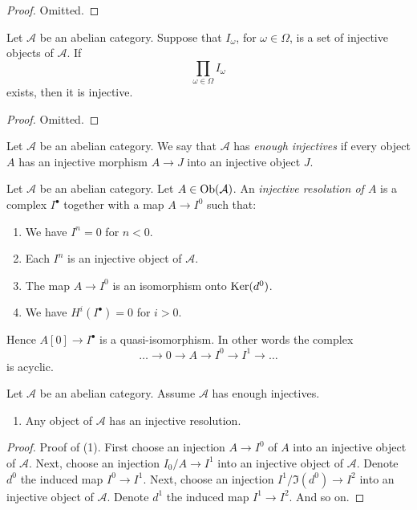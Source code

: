 \begin{proof}
Omitted.
\end{proof}

\begin{lemma}
\label{lemma-product-injectives}
Let $\mathcal{A}$ be an abelian category.
Suppose that $I_\omega$, for
$\omega \in \Omega$, is a set of injective
objects of $\mathcal{A}$. If
$$
\prod_{\omega \in \Omega} I_\omega
$$
exists, then it is injective.
\end{lemma}

\begin{proof}
Omitted.
\end{proof}

\begin{definition}
\label{definition-enough-injectives}
Let $\mathcal{A}$ be an abelian category.
We say that $\mathcal{A}$ has {\it enough
injectives} if every object $A$ has an
injective morphism $A \to J$ into an
injective object $J$.
\end{definition}

\begin{definition}
\label{definition-injective-resolution}
Let $\mathcal{A}$ be an abelian category.
Let $A \in \mathop{\mathrm{Ob}}\nolimits(\mathcal{A})$.
An {\it injective resolution of $A$} is a
complex $I^\bullet$ together with a map
$A \to I^0$ such that:
\begin{enumerate}
\item We have $I^n = 0$ for $n < 0$.
\item Each $I^n$ is an injective object of
$\mathcal{A}$.
\item The map $A \to I^0$ is an isomorphism
onto $\mathop{\mathrm{Ker}}(d^0)$.
\item We have $H^i(I^\bullet) = 0$ for
$i > 0$.
\end{enumerate}
Hence $A[0] \to I^\bullet$ is a
quasi-isomorphism.
In other words the complex
$$
\ldots \to 0 \to A \to I^0 \to I^1
\to \ldots
$$
is acyclic.
\end{definition}

\begin{lemma}
\label{lemma-injective-resolutions-exist}
Let $\mathcal{A}$ be an abelian category.
Assume $\mathcal{A}$ has enough injectives.
\begin{enumerate}
\item Any object of $\mathcal{A}$ has an
injective resolution.
\end{enumerate}
\end{lemma}

\begin{proof}
Proof of (1). First choose an injection
$A \to I^0$ of $A$ into an injective object
of $\mathcal{A}$. Next, choose an injection
$I_0/A \to I^1$ into an injective object of
$\mathcal{A}$. Denote $d^0$ the induced map
$I^0 \to I^1$.
Next, choose an injection
$I^1/\Im(d^0) \to I^2$ into an injective
object of $\mathcal{A}$. Denote $d^1$ the
induced map $I^1 \to I^2$. And so on.
\end{proof}

